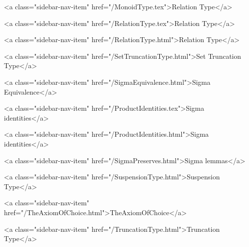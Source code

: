       
    
      
        
          <a class="sidebar-nav-item" href="/MonoidType.tex">Relation Type</a>
        
      
    
      
        
          <a class="sidebar-nav-item" href="/RelationType.tex">Relation Type</a>
        
      
    
      
        
          <a class="sidebar-nav-item" href="/RelationType.html">Relation Type</a>
        
      
    
      
        
          <a class="sidebar-nav-item" href="/SetTruncationType.html">Set Truncation Type</a>
        
      
    
      
        
          <a class="sidebar-nav-item" href="/SigmaEquivalence.html">Sigma Equivalence</a>
        
      
    
      
        
          <a class="sidebar-nav-item" href="/ProductIdentities.tex">Sigma identities</a>
        
      
    
      
        
          <a class="sidebar-nav-item" href="/ProductIdentities.html">Sigma identities</a>
        
      
    
      
        
          <a class="sidebar-nav-item" href="/SigmaPreserves.html">Sigma lemmas</a>
        
      
    
      
        
          <a class="sidebar-nav-item" href="/SuspensionType.html">Suspension Type</a>
        
      
    
      
        
          <a class="sidebar-nav-item" href="/TheAxiomOfChoice.html">TheAxiomOfChoice</a>
        
      
    
      
        
          <a class="sidebar-nav-item" href="/TruncationType.html">Truncation Type</a>
        
